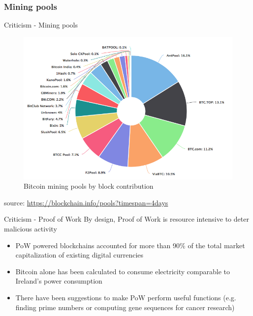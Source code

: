 \documentclass[9pt]{beamer}
\begin{document}
\subsubsection{Mining pools}

\begin{frame}{Criticism - Mining pools}
	\begin{figure}[]
		\centering
		\includegraphics  [scale=0.35]{Images/pool}
		\caption{Bitcoin mining pools by block contribution}
	\end{figure}
	\begin{scriptsize}
		source: \href{https://blockchain.info/pools?timespan=4days}{https://blockchain.info/pools?timespan=4days}
	\end{scriptsize}
\end{frame}


\begin{frame}{Criticism - Proof of Work}
	By design, Proof of Work is resource intensive to deter malicious activity
	\begin{itemize}
		\item PoW powered blockchains accounted for more than 90\% of the total market capitalization of existing digital currencies
		\item Bitcoin alone has been calculated to consume electricity comparable to Ireland's power consumption
		\item There have been suggestions to make PoW perform useful functions (e.g. finding prime numbers or computing gene sequences for cancer research)
	\end{itemize}
\end{frame}
\end{document}
